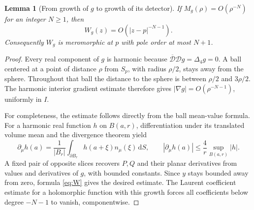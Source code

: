\documentclass[11pt,a4paper]{article}
\numberwithin{equation}{section}
\newtheorem{lemma}[theorem]{Lemma}
\theoremstyle{definition}
\theoremstyle{remark}
\newcommand{\cD}{\mathcal D}
\newcommand{\lap}{\Delta_4}
\newcommand{\dd}{\,\mathrm d}
\begin{document}
\begin{lemma}[From growth of $g$ to growth of its detector]
\label{lem:detector-growth}
If $M_g(\rho)=O(\rho^{-N})$ for an integer $N\geq1$, then
\[
 W_g(z)=O(|z-p|^{-N-1}).
\]
Consequently $W_g$ is meromorphic at $p$ with pole order at most $N+1$.
\end{lemma}
\begin{proof}
Every real component of $g$ is harmonic because
$\overline{\cD}\cD g=\lap g=0$. A ball centered at a point of distance $\rho$
from $S_p$, with radius $\rho/2$, stays away from the sphere. Throughout that
ball the distance to the sphere is between $\rho/2$ and $3\rho/2$.
The harmonic interior gradient estimate therefore gives
$|\nabla g|=O(\rho^{-N-1})$, uniformly in $I$.

For completeness, the estimate follows directly from the ball mean-value
formula. For a harmonic real function $h$ on $B(a,r)$, differentiation under
its translated volume mean and the divergence theorem yield
\[
 \partial_\mu h(a)=\frac1{|B_r|}\int_{\partial B_r}h(a+\xi)n_\mu(\xi)\dd S,
 \qquad |\partial_\mu h(a)|\leq\frac4r\sup_{B(a,r)}|h|.
\]
A fixed pair of opposite slices recovers $P,Q$ and their planar derivatives
from values and derivatives of $g$, with bounded constants. Since $y$ stays
bounded away from zero, formula \eqref{eq:W} gives the desired estimate.
The Laurent coefficient estimate for a holomorphic function with this growth
forces all coefficients below degree $-N-1$ to vanish, componentwise.
\end{proof}
\end{document}

